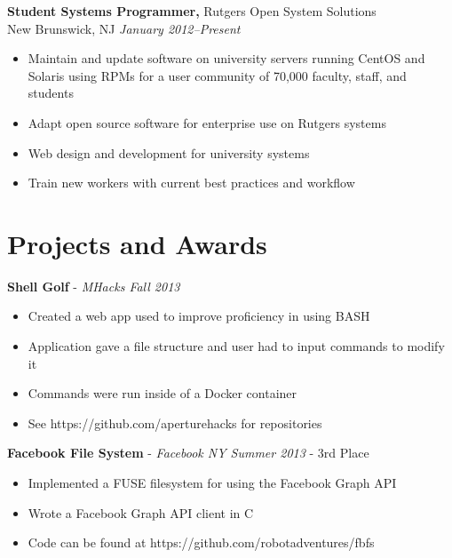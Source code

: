 \documentclass[margin]{res}
\begin{document}
\begin{resume}
{\bf Student Systems Programmer,} Rutgers Open System Solutions\\
New Brunswick, NJ \textit{January 2012--Present}
\begin{itemize} \itemsep -2pt %
	\item Maintain and update software on university servers running CentOS and
        Solaris using RPMs for a user community of 70,000 faculty, staff, and students
	\item Adapt open source software for enterprise use on Rutgers systems
	\item Web design and development for university systems
	\item Train new workers with current best practices and workflow
\end{itemize}


\section{Projects and Awards} 

    {\bf Shell Golf} - \textit{ MHacks Fall 2013}
    \begin{itemize} \itemsep -2pt
        \item Created a web app used to improve proficiency in using BASH
        \item Application gave a file structure and user had to input commands
        to modify it
        \item Commands were run inside of a Docker container
        \item See https://github.com/aperturehacks for repositories
    \end{itemize}

    {\bf Facebook File System} - \textit{Facebook NY Summer 2013} - 3rd Place
    \begin{itemize} \itemsep -2pt
        \item Implemented a FUSE filesystem for using the Facebook Graph API
        \item Wrote a Facebook Graph API client in C
        \item Code can be found at https://github.com/robotadventures/fbfs
    \end{itemize}


\end{resume}
\end{document}
